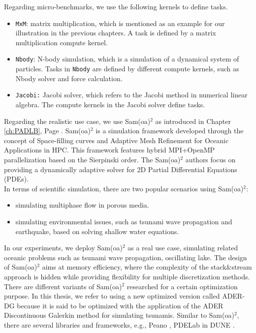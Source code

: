 Regarding micro-benchmarks, we use the following kernels to define tasks.
\begin{itemize}
	\item \texttt{MxM}: matrix multiplication, which is mentioned as an example for our illustration in the previous chapters. A task is defined by a matrix multiplication compute kernel.
	\item \texttt{Nbody}: N-body simulation, which is a simulation of a dynamical system of particles. Tasks in \texttt{Nbody} are defined by different compute kernels, such as Nbody solver and force calculation.
	\item \texttt{Jacobi:} Jacobi solver, which refers to the Jacobi method in numerical linear algebra. The compute kernels in the Jacobi solver define tasks.
\end{itemize}

Regarding the realistic use case, we use Sam(oa)$^2$ \cite{Meister2016AMRSamoa} as introduced in Chapter \ref{ch:PADLB}, Page \pageref{subsubsec:samoa-online-prediction}. Sam(oa)$^2$ is a simulation framework developed through the concept of Space-filling curves and Adaptive Mesh Refinement for Oceanic Applications in HPC. This framework features hybrid MPI+OpenMP parallelization based on the Sierpinski order. The Sam(oa)$^2$ authors focus on providing a dynamically adaptive solver for 2D Partial Differential Equations (PDEs).\\

In terms of scientific simulation, there are two popular scenarios using Sam(oa)$^2$: 
\begin{itemize}
	\item simulating multiphase flow in porous media.
	\item simulating environmental issues, such as tsunami wave propagation and earthquake, based on solving shallow water equations.
\end{itemize}

In our experiments, we deploy Sam(oa)$^2$ as a real use case, simulating related oceanic problems such as tsunami wave propagation, oscillating lake. The design of Sam(oa)$^2$ aims at memory efficiency, where the complexity of the stack\&stream approach is hidden while providing flexibility for multiple discretization methods. There are different variants of Sam(oa)$^2$ researched for a certain optimization purpose. In this thesis, we refer to using a new optimized version called ADER-DG \cite{rannabauer2018samoaaderdg} because it is said to be optimized with the application of the ADER Discontinuous Galerkin method for simulating tsunamis. Similar to Sam(oa)$^2$, there are several libraries and frameworks, e.g., Peano \cite{bungartz2010peano}, PDELab in DUNE \cite{blatt2007dune}.\\

